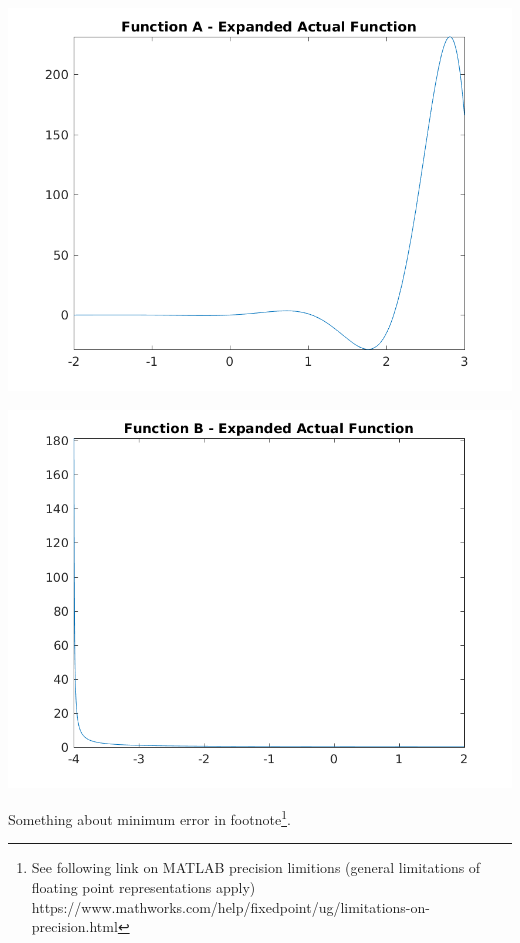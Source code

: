 \documentclass[a4paper]{article}
\begin{document}
\begin{center}
	\includegraphics[width=1\textwidth]{../output/a_expanded_actual.png}
	\label{fig:a_ex}
\end{center}


\begin{center}
	\includegraphics[width=1\textwidth]{../output/b_expanded_actual.png}
	\label{fig:b_ex}
\end{center}








Something about minimum error in footnote\footnote{See following link on MATLAB precision limitions (general limitations of floating point representations apply) https://www.mathworks.com/help/fixedpoint/ug/limitations-on-precision.html}.




\newpage


\end{document}

